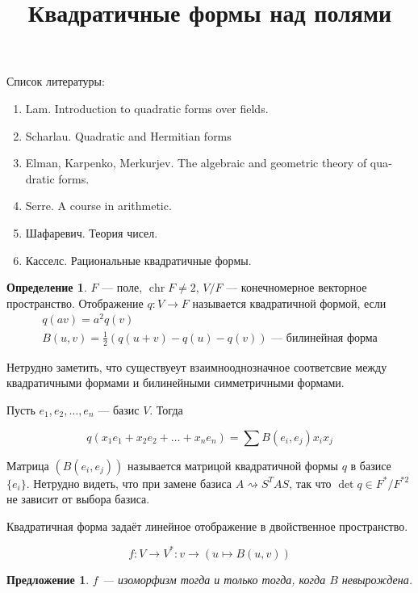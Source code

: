 \documentclass{article}
\title{Квадратичные формы над полями}
\author{}
\date{}
\newtheorem*{proposition}{Предложение}
\theoremstyle{definition}
\newtheorem*{definition}{Определение}
\theoremstyle{remark}
\DeclareMathOperator{\chr}{chr}
\begin{document}
\maketitle

Список литературы:

\begin{enumerate}
    \item \foreignlanguage{english}{Lam. Introduction to quadratic forms over fields.}
    \item \foreignlanguage{english}{Scharlau. Quadratic and Hermitian forms}
    \item \foreignlanguage{english}{Elman, Karpenko, Merkurjev. The algebraic and geometric theory of quadratic forms.}
    \item \foreignlanguage{english}{Serre. A course in arithmetic.}
    \item Шафаревич. Теория чисел.
    \item Касселс. Рациональные квадратичные формы.
\end{enumerate}

\begin{definition}
$F$ --- поле, $\chr F \neq 2$, $V/ F$ --- конечномерное векторное пространство. Отображение $q: V \longrightarrow F$ называется квадратичной формой, если 
\begin{gather*}
q(av) = a^2 q(v) \\
B(u, v) = \frac 1 2 (q(u + v) - q(u) - q(v))\text{ --- билинейная форма}
\end{gather*}
\end{definition}

Нетрудно заметить, что существуеут взаимнооднозначное соответсвие между квадратичными формами и билинейными симметричными формами.

Пусть $e_1, e_2, \ldots, e_n$ --- базис $V$. Тогда 

$$q(x_1e_1 + x_2 e_2 + \ldots + x_n e_n) = \sum B(e_i, e_j)x_ix_j$$

Матрица $(B(e_i, e_j))$ называется матрицой квадратичной формы $q$ в базисе $\{e_i\}$. Нетрудно видеть, что при замене базиса $A \rightsquigarrow S^T A S$, так что $\det q \in F^* / F^{*2}$ не зависит от выбора базиса.

Квадратичная форма задаёт линейное отображение в двойственное пространство.

$$f: V \rightarrow V^*: v \rightarrow (u \mapsto B(u, v))$$

\begin{proposition}
    $f$ --- изоморфизм тогда и только тогда, когда $B$ невырождена.
\end{proposition}
\end{document}
